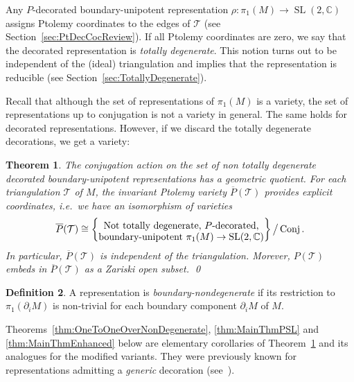 \documentclass[11pt]{amsart}
\theoremstyle{plain}
\newtheorem{theorem}{Theorem}[section]
\theoremstyle{definition}
\newtheorem{definition}[theorem]{Definition}
\numberwithin{equation}{section}
\newcommand{\C}{\mathbb C}
\newcommand{\T}{\mathcal T}
\DeclareMathOperator{\SL}{SL}
\DeclareMathOperator{\Conj}{Conj}
\begin{document}
Any $P$-decorated boundary-unipotent representation $\rho\colon\pi_1(M)\to\SL(2,\C)$ assigns Ptolemy coordinates to the edges of $\T$ (see Section~\ref{sec:PtDecCocReview}). If all Ptolemy coordinates are zero, we say that the decorated representation is \emph{totally degenerate}. This notion turns out to be independent of the (ideal) triangulation and implies that the representation is reducible (see Section~\ref{sec:TotallyDegenerate}).

Recall that although the set of representations of $\pi_1(M)$ is a variety, the set of representations up to conjugation is not a variety in general. The same holds for decorated representations. However, if we discard the totally degenerate decorations, we get a variety:


\begin{theorem}\label{thm:MainResult}
The conjugation action on the set of non totally degenerate decorated boundary-unipotent representations has a geometric quotient. For each triangulation $\T$ of $M$, the invariant Ptolemy variety $\overline P(\T)$ provides explicit coordinates, i.e.~we have an isomorphism of varieties
\begin{equation}\label{eq:MainResult}
\overline P(\T)\cong\left\{\txt{Not totally degenerate, $P$-decorated, \\boundary-unipotent $\pi_1(M)\to\SL(2,\C)$}\right\}\big/\Conj.
\end{equation} 
In particular, $\overline P(\T)$ is independent of the triangulation. Morever, $P(\T)$ embeds in $\overline P(\T)$ as a Zariski open subset. \qed
\end{theorem}


  

\begin{definition}A representation is \emph{boundary-nondegenerate} if its restriction to $\pi_1(\partial_i M)$ is non-trivial for each boundary component $\partial_i M$ of $M$. 
\end{definition}

Theorems~\ref{thm:OneToOneOverNonDegenerate}, \ref{thm:MainThmPSL} and \ref{thm:MainThmEnhanced} below are elementary corollaries of Theorem~\ref{thm:MainResult} and its analogues for the modified variants. They were previously known for representations admitting a \emph{generic} decoration (see~\cite{PtolemyField,GaroufalidisThurstonZickert,ZickertEnhancedPtolemy}). 
\end{document}

